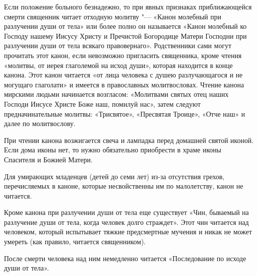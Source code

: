 \begin{mymulticols}


Если положение больного безнадежно, то при явных признаках приближающейся смерти священник читает отходную молитву "--- «Канон молебный при разлучении души от тела» или более полно он называется «Канон молебный ко Господу нашему Иисусу Христу и Пречистой Богородице Матери Господни при разлучении души от тела всякаго правовернаго». Родственники сами могут прочитать этот канон, если невозможно пригласить священника, кроме чтения «молитвы, от иерея глаголемой на исход души», которая находится в конце канона. Этот канон читается «от лица человека с душею разлучающагося и не могущаго глаголати» и имеется в православных молитвословах. Чтение канона мирскими людьми начинается возгласом: «Молитвами святых отец наших Господи Иисусе Христе Боже наш, помилуй нас», затем следуют предначинательные молитвы: «Трисвятое», «Пресвятая Троице», «Отче наш» и далее по молитвослову. 

При чтении канона возжигается свеча и лампадка перед домашней святой иконой. Если дома иконы нет, то нужно обязательно приобрести в храме иконы Спасителя и Божией Матери. 

Для умирающих младенцев (детей до семи лет) из-за отсутствия грехов, перечисляемых в каноне, которые несвойственны им по малолетству, канон не читается. 

Кроме канона при разлучении души от тела еще существует «Чин, бываемый на разлучение души от тела, когда человек долго страждет». Этот чин читается над человеком, который испытывает тяжкие предсмертные мучения и никак не может умереть (как правило, читается священником). 

После смерти человека над ним немедленно читается «Последование по исходе души от тела». 

\end{mymulticols}

\mychapterending

